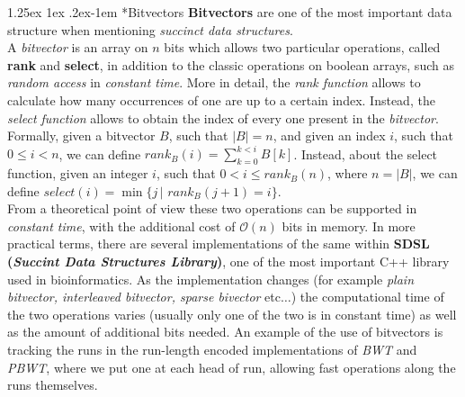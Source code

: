 \documentclass[a4paper,11pt, oneside]{article}
\makeatletter
\renewcommand{\paragraph}{%
  \@startsection{paragraph}{4}%
  {\z@}{1.25ex \@plus 1ex \@minus .2ex}{-1em}%
  {\normalfont\normalsize\bfseries}%
}
\makeatother
\begin{document}
\paragraph*{Bitvectors}
\textbf{Bitvectors} are one of the most important data structure when
mentioning \textit{succinct data structures}. \\
A \textit{bitvector} is an array on $n$ bits which allows two particular
operations, called \textbf{rank} and \textbf{select}, in addition to the classic
operations on boolean arrays, such as \textit{random access} in
\textit{constant time}. More in detail, the \textit{rank
function} allows to calculate how many occurrences of one are up to a certain
index. Instead, the \textit{select function} allows to obtain the index of every
one present in the \textit{bitvector}. Formally, given a bitvector $B$, such
that $|B|=n$, and given an index $i$, such that $0\leq i<n$, we can define
$rank_B(i)=\sum_{k=0}^{k<i} B[k]$. Instead, about the select function, given an
integer $i$, such that $0<i\leq rank_B(n)$, where $n=|B|$, we can define
$select(i)=\min\{j \,| \,\, rank_B(j+1)=i\}$.\\ 
From a theoretical point of view these two operations can be supported in
\textit{constant time}, with the additional cost of $\mathcal{O}(n)$ bits in
memory. In more practical terms, there are several implementations of the 
same within \textbf{SDSL (\textit{Succint Data Structures Library})}, one of the
most important C++ library used in bioinformatics. As 
the implementation changes (for example \textit{plain bitvector, interleaved
  bitvector, sparse bivector} etc$\ldots$) the computational time of the two
operations varies (usually only one of the two is in constant time) as well as
the amount of additional bits needed. An example of the use of bitvectors is
tracking the runs in the run-length encoded implementations of \textit{BWT} and
\textit{PBWT}, where we put one at each head of run, allowing fast operations
along the runs themselves. 
\end{document}

